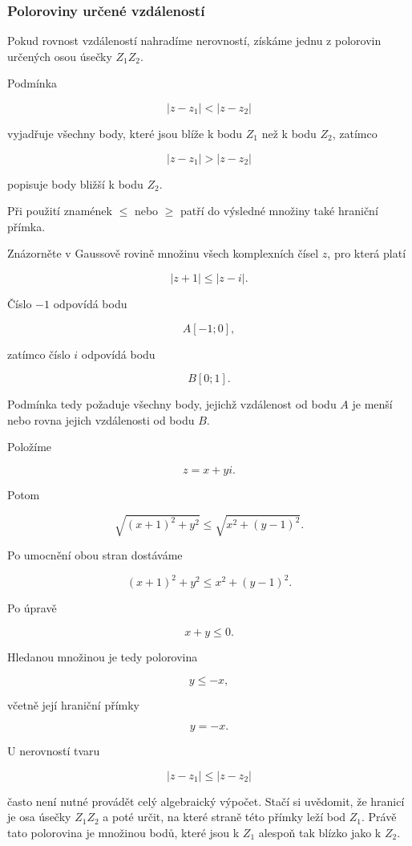 \documentclass[12pt,a4paper]{article}
\begin{document}
\subsubsection*{Poloroviny určené vzdáleností}

Pokud rovnost vzdáleností nahradíme nerovností, získáme jednu z polorovin
určených osou úsečky $Z_1Z_2$.

Podmínka

\[
    |z-z_1|<|z-z_2|
\]

vyjadřuje všechny body, které jsou blíže k bodu $Z_1$ než k bodu $Z_2$, zatímco

\[
    |z-z_1|>|z-z_2|
\]

popisuje body bližší k bodu $Z_2$.

Při použití znamének $\leq$ nebo $\geq$ patří do výsledné množiny také hraniční
přímka.

\begin{examplebox}

Znázorněte v Gaussově rovině množinu všech komplexních čísel $z$, pro která platí

\[
    |z+1|\leq|z-i|.
\]

Číslo $-1$ odpovídá bodu

\[
    A[-1;0],
\]

zatímco číslo $i$ odpovídá bodu

\[
    B[0;1].
\]

Podmínka tedy požaduje všechny body, jejichž vzdálenost od bodu $A$ je menší
nebo rovna jejich vzdálenosti od bodu $B$.

Položíme

\[
    z=x+yi.
\]

Potom

\[
    \sqrt{(x+1)^2+y^2}
    \leq
    \sqrt{x^2+(y-1)^2}.
\]

Po umocnění obou stran dostáváme

\[
    (x+1)^2+y^2
    \leq
    x^2+(y-1)^2.
\]

Po úpravě

\[
    x+y\leq0.
\]

Hledanou množinou je tedy polorovina

\[
    y\leq-x,
\]

včetně její hraniční přímky

\[
    y=-x.
\]

\end{examplebox}


\begin{notebox}

U nerovností tvaru

\[
    |z-z_1|\leq|z-z_2|
\]

často není nutné provádět celý algebraický výpočet. Stačí si uvědomit, že
hranicí je osa úsečky $Z_1Z_2$ a poté určit, na které straně této přímky leží
bod $Z_1$. Právě tato polorovina je množinou bodů, které jsou k $Z_1$ alespoň
tak blízko jako k $Z_2$.

\end{notebox}
\end{document}
